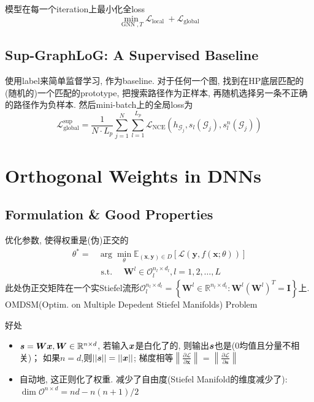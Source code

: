\documentclass{article}
\begin{document}
模型在每一个iteration上最小化全loss
\begin{equation}
    \min _{\operatorname{GNN}, T} \mathcal{L}_{\text {local }}+\mathcal{L}_{\text {global }}
\end{equation}

\subsection{Sup-GraphLoG: A Supervised Baseline}

使用label来简单监督学习, 作为baseline. 对于任何一个图, 找到在HP底层匹配的(随机的)一个匹配的prototype, 把搜索路径作为正样本, 再随机选择另一条不正确的路径作为负样本. 然后mini-batch上的全局loss为
\begin{equation}
    \mathcal{L}_{\mathrm{global}}^{\mathrm{sup}}=\frac{1}{N \cdot L_{p}} \sum_{j=1}^{N} \sum_{l=1}^{L_{p}} \mathcal{L}_{\mathrm{NCE}}\left(h_{\mathcal{G}_{j}}, s_{l}\left(\mathcal{G}_{j}\right), s_{l}^{n}\left(\mathcal{G}_{j}\right)\right)
\end{equation}


\section{Orthogonal Weights in DNNs}

\subsection{Formulation \& Good Properties}
\flushleft
优化参数, 使得权重是(伪)正交的
\begin{equation}
    \begin{aligned}
    \theta^{*}=& \arg \min _{\theta} \mathbb{E}_{(\mathbf{x}, \mathbf{y}) \in D}[\mathcal{L}(\mathbf{y}, f(\mathbf{x} ; \theta))] \\
    & \text { s.t. } \quad \mathbf{W}^{l} \in \mathcal{O}_{l}^{n_{l} \times d_{l}}, l=1,2, \ldots, L
    \end{aligned}
\end{equation}
此处伪正交矩阵在一个实Stiefel流形$\mathcal{O}_{l}^{n_{l} \times d_{l}}=\left\{\mathbf{W}^{l} \in \mathbb{R}^{n_{l} \times d_{l}}: \mathbf{W}^{l}\left(\mathbf{W}^{l}\right)^{T}=\mathbf{I}\right\}$上. \trarr OMDSM(Optim. on Multiple Depedent Stiefel Manifolds) Problem

好处
\begin{itemize}
    \item $\boldsymbol{s} = \boldsymbol{W} \boldsymbol{x}, \boldsymbol{W}\in \mathbb{R}^{n\times d}$, 若输入$\boldsymbol{x}$是白化了的, 则输出$\boldsymbol{s}$也是(0均值且分量不相关)； 如果$n=d$,则$||\boldsymbol{s}|| = || \boldsymbol{x} ||$; 梯度相等$\left\|\frac{\partial \mathcal{L}}{\partial \mathbf{x}}\right\|=\left\|\frac{\partial \mathcal{L}}{\partial \mathbf{s}}\right\|$
    \item 自动地, 这正则化了权重. 减少了自由度(Stiefel Manifold的维度减少了): $\dim \mathcal{O}^{n\times d}=nd-n(n+1)/2$
\end{itemize}
\end{document}
